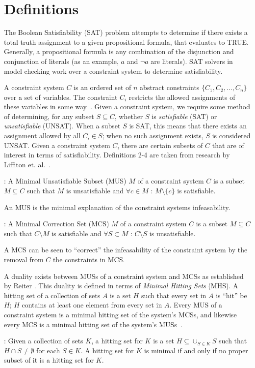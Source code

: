 \section{Definitions}
\label{sec:definitions}
The Boolean Satisfiability (SAT) problem attempts to determine if there exists a total truth assignment to a given propositional formula, that evaluates to TRUE. Generally, a propositional formula is any combination of the disjunction and conjunction of literals (as an example, $a$ and $\neg a$ are literals). SAT solvers in model checking work over a constraint system to determine satisfiability.

A constraint system $C$ is an ordered set of $n$ abstract constraints $\{C_1, C_2, ..., C_n\}$ over a set of variables. The constraint $C_i$ restricts the allowed assignments of these variables in some way~\cite{liffiton2016fast}. Given a constraint system, we require some method of determining, for any subset $S \subseteq C$, whether $S$ is \textit{satisfiable} (SAT) or \textit{unsatisfiable} (UNSAT). When a subset $S$ is SAT, this means that there exists an assignment allowed by all $C_i \in S$; when no such assignment exists, $S$ is considered UNSAT. Given a constraint system $C$, there are certain subsets of $C$ that are of interest in terms of satisfiability. Definitions 2-4 are taken from research by Liffiton et. al.~\cite{liffiton2016fast}. 

\begin{definition} : A Minimal Unsatisfiable Subset (MUS) $M$ of a constraint system $C$ is a subset $M \subseteq C$ such that $M$ is unsatisfiable and $\forall c \in M$ : $M \setminus \{c\}$ is satisfiable. 
\end{definition}
An MUS is the minimal explanation of the constraint systems infeasability. 
\begin{definition} : A Minimal Correction Set (MCS) $M$ of a constraint system $C$ is a subset $M\subseteq C$ such that $C \setminus M$ is satisfiable and $\forall S \subset M$ : $C \setminus S$ is unsatisfiable. 
\end{definition}
A MCS can be seen to ``correct'' the infeasability of the constraint system by the removal from $C$ the constraints in MCS.

A duality exists between MUSs of a constraint system and MCSs as established by Reiter \cite{reiter1987theory}. This duality is defined in terms of \textit{Minimal Hitting Sets} (MHS). A hitting set of a collection of sets $A$ is a set $H$ such that every set in $A$ is ``hit'' be $H$; $H$ contains at least one element from every set in $A$. Every MUS of a constraint system is a minimal hitting set of the system's MCSs, and likewise every MCS is a minimal hitting set of the system's MUSs~\cite{liffiton2016fast, reiter1987theory, de1987diagnosing}.
\begin{definition}: Given a collection of sets $K$, a hitting set for $K$ is a set $H \subseteq \cup_{S \in K} S$ such that $H \cap S \neq \emptyset$ for each $S  \in K$. A hitting set for $K$ is minimal if and only if no proper subset of it is a hitting set for $K$. 
\end{definition}

